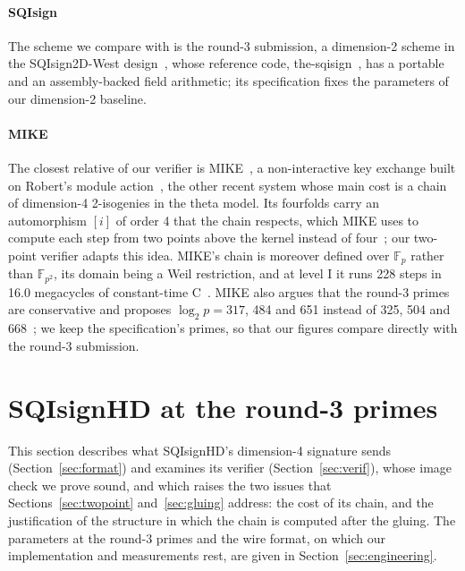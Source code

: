 \documentclass[version=preprint]{iacrcc}
\begin{document}
    \paragraph{SQIsign}
    The scheme we compare with is the round-3 submission, a dimension-2 scheme
    in the SQIsign2D-West design~\cite{BDF+24,AAA+26}, whose reference code,
    the-sqisign~\cite{SQI26}, has a portable and an assembly-backed field
    arithmetic; its specification fixes the parameters of our dimension-2
    baseline.

    \paragraph{MIKE}
    The closest relative of our verifier is MIKE~\cite{BDD+26}, a
    non-interactive key exchange built on Robert's module
    action~\cite{Rob24b}, the other recent system whose main cost is a chain
    of dimension-4 2-isogenies in the theta model. Its fourfolds carry an
    automorphism $[i]$ of order 4 that the chain respects, which MIKE uses to
    compute each step from two points above the kernel instead of
    four~\cite[Appendix E.2]{BDD+26}; our two-point verifier adapts this idea.
    MIKE's chain is moreover defined over $\mathbb{F}_p$ rather than
    $\mathbb{F}_{p^2}$, its domain being a Weil restriction, and at level I it
    runs 228 steps in 16.0 megacycles of constant-time C~\cite[Table
    1]{BDD+26}. MIKE also argues that the round-3 primes are conservative and
    proposes $\log_2 p = 317$, 484 and 651 instead of 325, 504 and
    668~\cite[Section 4.5]{BDD+26}; we keep the specification's primes, so
    that our figures compare directly with the round-3 submission.

    \section{SQIsignHD at the round-3 primes}
    \label{sec:dim4}

    This section describes what SQIsignHD's dimension-4 signature sends
    (Section~\ref{sec:format}) and examines its verifier
    (Section~\ref{sec:verif}), whose image check we prove sound, and which
    raises the two issues that
    Sections~\ref{sec:twopoint} and~\ref{sec:gluing} address: the cost of its
    chain, and the justification of the structure in which the chain is
    computed after the gluing. The parameters at the round-3 primes and the
    wire format, on which our implementation and measurements rest, are given
    in Section~\ref{sec:engineering}.
\end{document}
